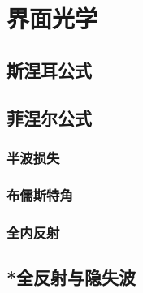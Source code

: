 

\section{界面光学}\label{22-2}

\subsection{斯涅耳公式}\label{22-2-1}

\subsection{菲涅尔公式}\label{22-2-2}

\subsubsection{半波损失}\label{22-2-2-1}

\subsubsection{布儒斯特角}\label{22-2-2-2}

\subsubsection{全内反射}\label{22-2-2-3}

\subsection{*全反射与隐失波}\label{22-2-3}